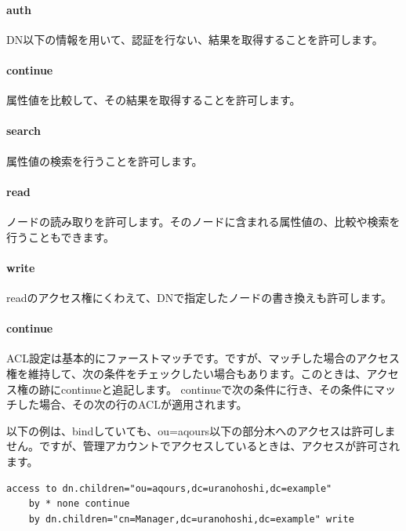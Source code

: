 \paragraph{auth}
DN以下の情報を用いて、認証を行ない、結果を取得することを許可します。

\paragraph{continue}
属性値を比較して、その結果を取得することを許可します。

\paragraph{search}
属性値の検索を行うことを許可します。

\paragraph{read}
ノードの読み取りを許可します。そのノードに含まれる属性値の、比較や検索を行うこともできます。

\paragraph{write}
readのアクセス権にくわえて、DNで指定したノードの書き換えも許可します。

\paragraph{continue}
ACL設定は基本的にファーストマッチです。ですが、マッチした場合のアクセス権を維持して、次の条件をチェックしたい場合もあります。このときは、アクセス権の跡にcontinueと追記します。
continueで次の条件に行き、その条件にマッチした場合、その次の行のACLが適用されます。

以下の例は、bindしていても、ou=aqours以下の部分木へのアクセスは許可しません。ですが、管理アカウントでアクセスしているときは、アクセスが許可されます。

\begin{verbatim}
access to dn.children="ou=aqours,dc=uranohoshi,dc=example"
    by * none continue
    by dn.children="cn=Manager,dc=uranohoshi,dc=example" write

\end{verbatim}